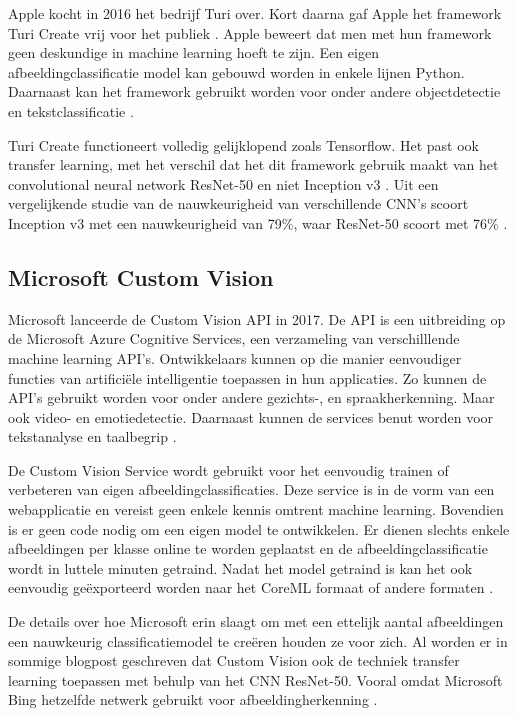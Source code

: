 Apple kocht in 2016 het bedrijf Turi over. Kort daarna gaf Apple het framework Turi Create vrij voor het publiek \autocite{9to5mac}. Apple beweert dat men met hun framework geen deskundige in machine learning hoeft te zijn. Een eigen afbeeldingclassificatie model kan gebouwd worden in enkele lijnen Python. Daarnaast kan het framework gebruikt worden voor onder andere objectdetectie en tekstclassificatie \autocite{githubturi}.

Turi Create functioneert volledig gelijklopend zoals Tensorflow. Het past ook transfer learning, met het verschil dat het dit framework gebruik maakt van het convolutional neural network ResNet-50 en niet Inception v3 \autocite{hackermoon}. Uit een vergelijkende studie van de nauwkeurigheid van verschillende \acrshort{CNN}’s scoort Inception v3 met een nauwkeurigheid van 79\%, waar ResNet-50 scoort met 76\% \autocite{arxiv}.

\subsection{Microsoft Custom Vision}
\label{ssec:Microsoft Custom Vision}

Microsoft lanceerde de Custom Vision API in 2017. De \acrshort{API} is een uitbreiding op de Microsoft Azure Cognitive Services, een verzameling van verschilllende machine learning \acrshort{API}’s. Ontwikkelaars kunnen op die manier eenvoudiger functies van artificiële intelligentie toepassen in hun applicaties. Zo kunnen de \acrshort{API}’s gebruikt worden voor onder andere gezichts-, en spraakherkenning. Maar ook video- en emotiedetectie. Daarnaast kunnen de services benut worden voor tekstanalyse en taalbegrip \autocite{cognitiveservices}.

De Custom Vision Service wordt gebruikt voor het eenvoudig trainen of verbeteren van eigen afbeeldingclassificaties. Deze service is in de vorm van een webapplicatie en vereist geen enkele kennis omtrent machine learning. Bovendien is er geen code nodig om een eigen model te ontwikkelen. Er dienen slechts enkele afbeeldingen per klasse online te worden geplaatst en de afbeeldingclassificatie wordt in luttele minuten getraind. Nadat het model getraind is kan het ook eenvoudig geëxporteerd worden naar het CoreML formaat of andere formaten \autocite{appliedies}.

De details over hoe Microsoft erin slaagt om met een ettelijk aantal afbeeldingen een nauwkeurig classificatiemodel te creëren houden ze voor zich. Al worden er in sommige blogpost geschreven dat Custom Vision ook de techniek transfer learning toepassen met behulp van het \acrshort{CNN} ResNet-50. Vooral omdat Microsoft Bing hetzelfde netwerk gebruikt voor afbeeldingherkenning \autocite{praeclarum}.







